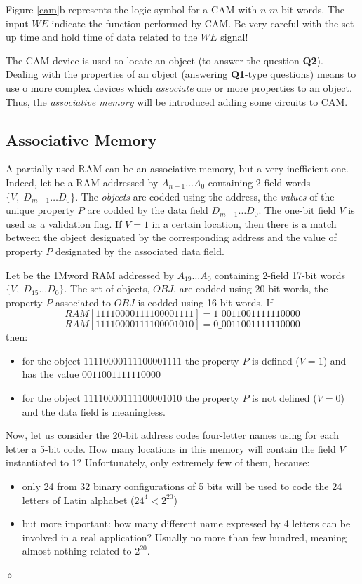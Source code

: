 Figure \ref{cam}b represents the logic symbol for a CAM with $n$
$m$-bit words. The input $WE$ indicate the function performed by
CAM. Be very careful with the set-up time and hold time of data
related to the $WE$ signal!

The CAM device is used to locate an object (to answer the question
{\bf Q2}). Dealing with the properties of an object (answering
{\bf Q1}-type questions) means to use o more complex devices which
{\em associate} one or more properties to an object. Thus, the
{\em associative memory} will be introduced adding some circuits
to CAM.


\subsection{Associative Memory}\label{assocMemory}

A partially used RAM can be an associative memory, but a very
inefficient one. Indeed, let be a RAM addressed by $A_{n-1} \ldots
A_{0}$ containing 2-field words $\{V, \; D_{m-1} \ldots D_{0}\}$.
The {\em objects} are codded using the address, the {\em values}
of the unique property $P$ are codded by the data field $D_{m-1}
\ldots D_{0}$. The one-bit field $V$ is used as a validation flag.
If $V=1$ in a certain location, then there is a match between the
object designated by the corresponding address and the value of
property $P$ designated by the associated data field.

\begin{exemplu}
Let be the 1Mword RAM addressed by $A_{19} \ldots A_{0}$
containing 2-field 17-bit words $\{V, \; D_{15} \ldots D_{0}\}$.
The set of objects, $OBJ$, are codded using 20-bit words, the
property $P$ associated to $OBJ$ is codded using 16-bit words. If
$$RAM[11110000111100001111] = 1\_0011001111110000$$
$$RAM[11110000111100001010] = 0\_0011001111110000$$
then:
\begin{itemize}
    \item for the object $11110000111100001111$ the property $P$
    is defined ($V=1$) and has the value $0011001111110000$
    \item for the object $11110000111100001010$ the property $P$
    is not defined ($V=0$) and the data field is meaningless.
\end{itemize}
Now, let us consider the 20-bit address codes four-letter names
using for each letter a 5-bit code. How many locations in this
memory will contain the field $V$ instantiated to 1?
Unfortunately, only extremely few of them, because:
\begin{itemize}
    \item only 24 from 32 binary configurations of 5 bits will be
    used to code the 24 letters of Latin alphabet ($24^{4} <
    2^{20}$)
    \item but more important: how many different name expressed by 4
    letters can be involved in a real application? Usually no more
    than few hundred, meaning almost nothing related to $2^{20}$.
\end{itemize}
 $\diamond$
\end{exemplu}

